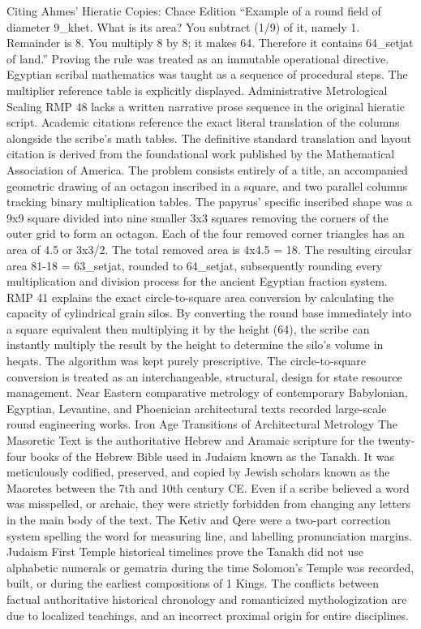 Citing Ahmes’ Hieratic Copies: Chace Edition
“Example of a round field of diameter 9_khet. What is its area?
You subtract (1/9) of it, namely 1. Remainder is 8.
You multiply 8 by 8; it makes 64. Therefore it contains 64_setjat of land.”
 Proving the rule was treated as an immutable operational directive. Egyptian scribal mathematics was taught as a sequence of procedural steps. The multiplier reference table is explicitly displayed.
Administrative Metrological Scaling
RMP 48 lacks a written narrative prose sequence in the original hieratic script. Academic citations reference the exact literal translation of the columns alongside the scribe’s math tables. The definitive standard translation and layout citation is derived from the foundational work published by the Mathematical Association of America. The problem consists entirely of a title, an accompanied geometric drawing of an octagon inscribed in a square, and two parallel columns tracking binary multiplication tables. The papyrus’ specific inscribed shape was a 9x9 square divided into nine smaller 3x3 squares removing the corners of the outer grid to form an octagon. Each of the four removed corner triangles has an area of 4.5 or 3x3/2. The total removed area is 4x4.5 = 18. The resulting circular area 81-18 = 63_setjat, rounded to 64_setjat, subsequently rounding every multiplication and division process for the ancient Egyptian fraction system.
RMP 41 explains the exact circle-to-square area conversion by calculating the capacity of cylindrical grain silos. By converting the round base immediately into a square equivalent then multiplying it by the height (64), the scribe can instantly multiply the result by the height to determine the silo's volume in heqats. The algorithm was kept purely prescriptive. The circle-to-square conversion is treated as an interchangeable, structural, design for state resource management. Near Eastern comparative metrology of contemporary Babylonian, Egyptian, Levantine, and Phoenician architectural texts recorded large-scale round engineering works. 
Iron Age Transitions of Architectural Metrology
The Masoretic Text is the authoritative Hebrew and Aramaic scripture for the twenty-four books of the Hebrew Bible used in Judaism known as the Tanakh. It was meticulously codified, preserved, and copied by Jewish scholars known as the Maoretes between the 7th and 10th century CE. Even if a scribe believed a word was misspelled, or archaic, they were strictly forbidden from changing any letters in the main body of the text. The Ketiv and Qere were a two-part correction system spelling the word for measuring line, and labelling pronunciation margins. Judaism First Temple historical timelines prove the Tanakh did not use alphabetic numerals or gematria during the time Solomon's Temple was recorded, built, or during the earliest compositions of 1 Kings. The conflicts between factual authoritative historical chronology and romanticized mythologization are due to localized teachings, and an incorrect proximal origin for entire disciplines.
